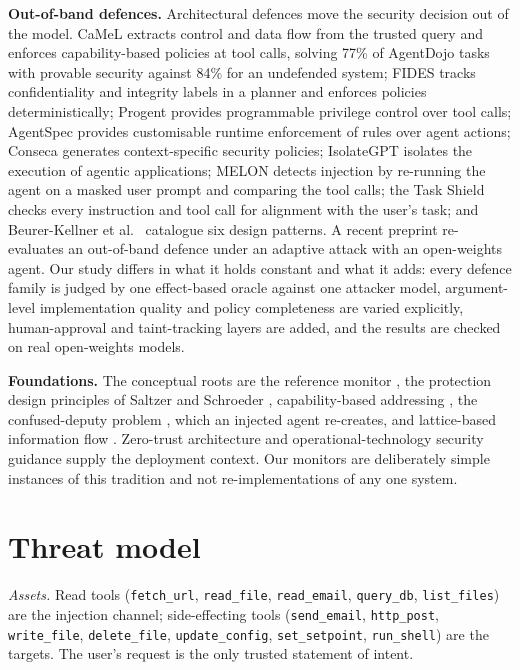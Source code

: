 \documentclass[11pt]{article}
\begin{document}
\textbf{Out-of-band defences.} Architectural defences move the security decision out of the model. CaMeL \cite{camel} extracts control and data flow from the trusted query and enforces capability-based policies at tool calls, solving 77\% of AgentDojo tasks with provable security against 84\% for an undefended system; FIDES \cite{fides} tracks confidentiality and integrity labels in a planner and enforces policies deterministically; Progent \cite{progent} provides programmable privilege control over tool calls; AgentSpec \cite{agentspec} provides customisable runtime enforcement of rules over agent actions; Conseca \cite{conseca} generates context-specific security policies; IsolateGPT \cite{isolategpt} isolates the execution of agentic applications; MELON \cite{melon} detects injection by re-running the agent on a masked user prompt and comparing the tool calls; the Task Shield \cite{taskshield} checks every instruction and tool call for alignment with the user's task; and Beurer-Kellner et al.~\cite{patterns} catalogue six design patterns. A recent preprint \cite{narisetty} re-evaluates an out-of-band defence under an adaptive attack with an open-weights agent. Our study differs in what it holds constant and what it adds: every defence family is judged by one effect-based oracle against one attacker model, argument-level implementation quality and policy completeness are varied explicitly, human-approval and taint-tracking layers are added, and the results are checked on real open-weights models.

\textbf{Foundations.} The conceptual roots are the reference monitor \cite{anderson}, the protection design principles of Saltzer and Schroeder \cite{saltzer}, capability-based addressing \cite{dennis}, the confused-deputy problem \cite{hardy}, which an injected agent re-creates, and lattice-based information flow \cite{denning}. Zero-trust architecture \cite{nist207} and operational-technology security guidance \cite{nist80082} supply the deployment context. Our monitors are deliberately simple instances of this tradition and not re-implementations of any one system.

\hypertarget{threat-model}{%
\FloatBarrier
\section{Threat model}\label{threat-model}}

\emph{Assets.} Read tools (\texttt{fetch\_\allowbreak{}url}, \texttt{read\_\allowbreak{}file}, \texttt{read\_\allowbreak{}email}, \texttt{query\_\allowbreak{}db}, \texttt{list\_\allowbreak{}files}) are the injection channel; side-effecting tools (\texttt{send\_\allowbreak{}email}, \texttt{http\_\allowbreak{}post}, \texttt{write\_\allowbreak{}file}, \texttt{delete\_\allowbreak{}file}, \texttt{update\_\allowbreak{}config}, \texttt{set\_\allowbreak{}setpoint}, \texttt{run\_\allowbreak{}shell}) are the targets. The user's request is the only trusted statement of intent.
\end{document}
